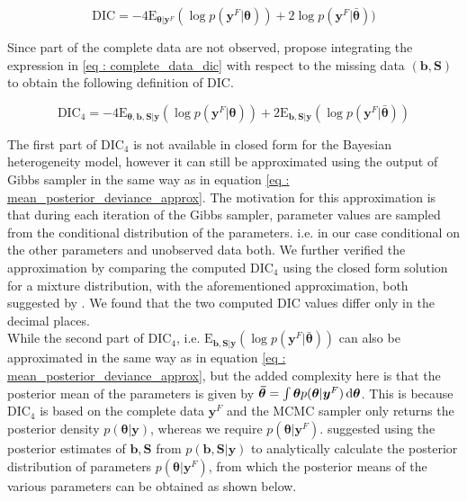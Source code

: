 \begin{equation}
\label{eq : complete_data_dic}
\text{DIC} = -4\text{E}_{\boldsymbol{\theta}|\boldsymbol{y}^F}(\log{p(\boldsymbol{y}^F|\boldsymbol{\theta})}) + 
2\log{p(\boldsymbol{y}^F|\boldsymbol{\bar{\theta}})})
\end{equation}

Since part of the complete data are not observed, \citet{celeux_deviance_2006} propose integrating the expression in \ref{eq : complete_data_dic} with respect to the missing data $(\boldsymbol{b}, \boldsymbol{S})$ to obtain the following definition of DIC.

\begin{equation}
\label{eq : DIC4}
\text{DIC}_4 = -4\text{E}_{\boldsymbol{\theta}, \boldsymbol{b}, \boldsymbol{S}|\boldsymbol{y}}(\log{p(\boldsymbol{y}^F|\boldsymbol{\theta})}) + 
2\text{E}_{\boldsymbol{b}, \boldsymbol{S}|\boldsymbol{y}}(\log{p(\boldsymbol{y}^F|\boldsymbol{\bar{\theta}})})
\end{equation}

The first part of $\text{DIC}_4$ is not available in closed form for the Bayesian heterogeneity model, however it can still be approximated using the output of Gibbs sampler in the same way as in equation \ref{eq : mean_posterior_deviance_approx}. The motivation for this approximation is that during each iteration of the Gibbs sampler, parameter values are sampled from the conditional distribution of the parameters. i.e. in our case conditional on the other parameters and unobserved data both. We further verified the approximation by comparing the computed $\text{DIC}_4$ using the closed form solution for a mixture distribution, with the aforementioned approximation, both suggested by \citet{celeux_deviance_2006}. We found that the two computed DIC values differ only in the decimal places.\\

While the second part of $\text{DIC}_4$, i.e. $\text{E}_{\boldsymbol{b}, \boldsymbol{S}|\boldsymbol{y}}(\log{p(\boldsymbol{y}^F|\boldsymbol{\bar{\theta}})})$ can also be approximated in the same way as in equation \ref{eq : mean_posterior_deviance_approx}, but the added complexity here is that the posterior mean of the parameters is given by $\boldsymbol{\bar{\theta}} = \int \boldsymbol{\theta} p(\boldsymbol{\theta}|\boldsymbol{y}^F) \mathop{}\!\mathrm{d}\boldsymbol{\theta}$. This is because $\text{DIC}_4$ is based on the complete data $\boldsymbol{y}^F$ and the MCMC sampler only returns the posterior density $p(\boldsymbol{\theta}|\boldsymbol{y})$, whereas we require $p(\boldsymbol{\theta}|\boldsymbol{y}^F)$. \citet{celeux_deviance_2006} suggested using the posterior estimates of $\boldsymbol{b}, \boldsymbol{S}$ from $p(\boldsymbol{b}, \boldsymbol{S}|\boldsymbol{y})$ to analytically calculate the posterior distribution of parameters $p(\boldsymbol{\theta}|\boldsymbol{y}^F)$, from which the posterior means of the various parameters can be obtained as shown below.

